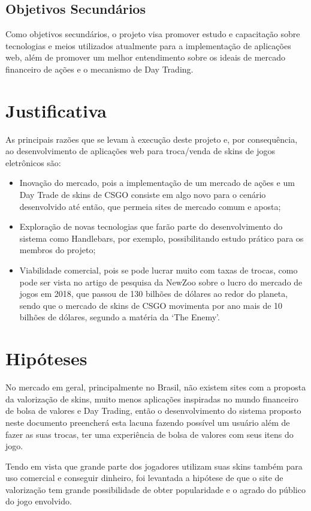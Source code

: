 \documentclass[a4paper, 12pt]{article}
\begin{document}
    \subsection{Objetivos Secundários}
    Como objetivos secundários, o projeto visa promover estudo e capacitação sobre tecnologias e meios utilizados atualmente para a implementação de aplicações web, além de promover um melhor entendimento sobre os ideais de mercado financeiro de ações e o mecanismo de Day Trading.

    \section{Justificativa}
    As principais razões que se levam à execução deste projeto e, por consequência, ao desenvolvimento de aplicações web para troca/venda de skins de jogos eletrônicos são: 

    \begin{itemize}
        \item Inovação do mercado, pois a implementação de um mercado de ações e um Day Trade de skins de CSGO consiste em algo novo para o cenário desenvolvido até então, que permeia sites de mercado comum e aposta;
        \item Exploração de novas tecnologias que farão parte do desenvolvimento do sistema como Handlebars, por exemplo, possibilitando estudo prático para os membros do projeto;
        \item Viabilidade comercial, pois se pode lucrar muito com taxas de trocas, como pode ser vista no artigo de pesquisa da NewZoo sobre o lucro do mercado de jogos em 2018, que passou de 130 bilhões de dólares ao redor do planeta, sendo que o mercado de skins de CSGO movimenta por ano mais de 10 bilhões de dólares, segundo a matéria da ‘The Enemy’.
      \end{itemize}

    \section{Hipóteses}
    No mercado em geral, principalmente no Brasil, não existem sites com a proposta da valorização de skins, muito menos aplicações inspiradas no mundo financeiro de bolsa de valores e Day Trading, então o desenvolvimento do sistema proposto neste documento preencherá esta lacuna fazendo possível um usuário além de fazer as suas trocas, ter uma experiência de bolsa de valores com seus itens do jogo. 
    
    Tendo em vista que grande parte dos jogadores utilizam suas skins também para uso comercial e conseguir dinheiro, foi levantada a hipótese de que o site de valorização tem grande possibilidade de obter popularidade e o agrado do público do jogo envolvido.
\end{document}
